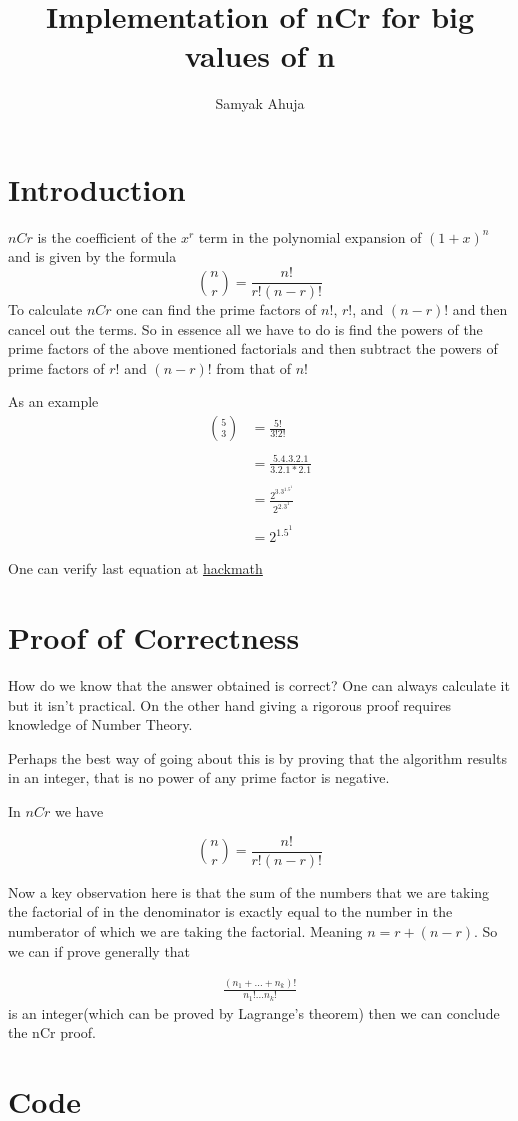 \documentclass{article}
\title{Implementation of nCr for big values of n}
\author{Samyak Ahuja}
\begin{document}
\maketitle

\section{Introduction}
$nCr$ is the coefficient of the $x^r$ term in the polynomial
expansion of $(1+x)^n$ and is given by the formula
\[
    \binom{n}{r} = \frac{n!}{r!(n-r)!}
\]
To calculate $nCr$ one can find the prime factors of $n!$, $r!$, 
and $(n-r)!$ and then cancel out the terms. So in essence all we
have to do is find the powers of the prime factors of the above 
mentioned factorials and then subtract the powers of prime factors 
of $r!$ and $(n-r)!$ from that of $n!$

\vspace{0.2in}

As an example
\begin{align*}
\binom{5}{3} &= \frac{5!}{3!2!} \\\\
&= \frac{5.4.3.2.1}{3.2.1 * 2.1}\\\\
&= \frac{2^3.3^1.5^1}{2^2.3^1}\\\\
&= 2^1.5^1
\end{align*}

One can verify last equation at
\href{https://www.hackmath.net/en/calculator/n-choose-k}{hackmath}

\section{Proof of Correctness}

How do we know that the answer obtained is correct? One can always
calculate it but it isn't practical. On the other hand giving a
rigorous proof requires knowledge of Number Theory. 

Perhaps the best way of going about this is by proving that
the algorithm results in an integer, that is no power of any 
prime factor is negative.

In $nCr$ we have

\[
    \binom{n}{r} = \frac{n!}{r!(n-r)!}
\]

Now a key observation here is that the sum of the numbers that we are
taking the factorial of in the denominator is exactly equal to the 
number in the numberator of which we are taking the factorial. Meaning
$n = r + (n - r)$. So we can if prove generally that

\begin{align*}
     \frac{(n_1 + ... + n_k)!}{n_1!...n_k!}
\end{align*}
is an integer(which can be proved by Lagrange's theorem)
then we can conclude the nCr proof. 

\section{Code}


\end{document}

